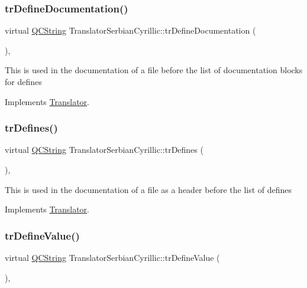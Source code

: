 \subsubsection{\texorpdfstring{trDefineDocumentation()}{trDefineDocumentation()}}
{\footnotesize\ttfamily virtual \mbox{\hyperlink{class_q_c_string}{Q\+C\+String}} Translator\+Serbian\+Cyrillic\+::tr\+Define\+Documentation (\begin{DoxyParamCaption}{ }\end{DoxyParamCaption})\hspace{0.3cm}{\ttfamily [inline]}, {\ttfamily [virtual]}}

This is used in the documentation of a file before the list of documentation blocks for defines 

Implements \mbox{\hyperlink{class_translator}{Translator}}.

\mbox{\label{class_translator_serbian_cyrillic_a64840de5ab1afda63a8d4e0c4de6c171}} 
\subsubsection{\texorpdfstring{trDefines()}{trDefines()}}
{\footnotesize\ttfamily virtual \mbox{\hyperlink{class_q_c_string}{Q\+C\+String}} Translator\+Serbian\+Cyrillic\+::tr\+Defines (\begin{DoxyParamCaption}{ }\end{DoxyParamCaption})\hspace{0.3cm}{\ttfamily [inline]}, {\ttfamily [virtual]}}

This is used in the documentation of a file as a header before the list of defines 

Implements \mbox{\hyperlink{class_translator}{Translator}}.

\mbox{\label{class_translator_serbian_cyrillic_ae924f00ec68192ba76889b26257f19b5}} 
\subsubsection{\texorpdfstring{trDefineValue()}{trDefineValue()}}
{\footnotesize\ttfamily virtual \mbox{\hyperlink{class_q_c_string}{Q\+C\+String}} Translator\+Serbian\+Cyrillic\+::tr\+Define\+Value (\begin{DoxyParamCaption}{ }\end{DoxyParamCaption})\hspace{0.3cm}{\ttfamily [inline]}, {\ttfamily [virtual]}}

